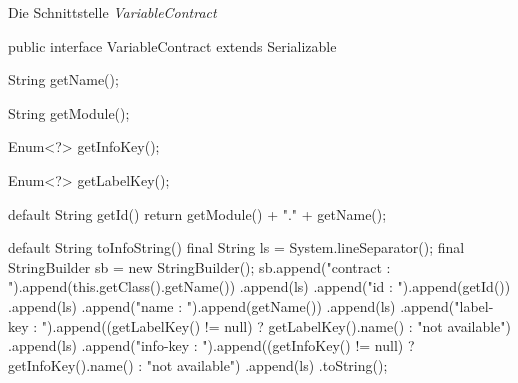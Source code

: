 \begin{program}[h]
\caption{Die Schnittstelle \emph{VariableContract}}
\label{prog:variableContract}
\begin{JavaCode}
public interface VariableContract extends Serializable {

    String getName();

    String getModule();

    Enum<?> getInfoKey();

    Enum<?> getLabelKey();

    default String getId() {      
        return getModule() + "." + getName();
    }

    default String toInfoString() {
        final String ls = System.lineSeparator();
        final StringBuilder sb = new StringBuilder();
        sb.append("contract  : ").append(this.getClass().getName())
          .append(ls)
          .append("id        : ").append(getId())
          .append(ls)
          .append("name      : ").append(getName())
          .append(ls)
          .append("label-key : ").append((getLabelKey() != null) 
                                          ? getLabelKey().name() 
                                          : "not available")
          .append(ls)
          .append("info-key  : ").append((getInfoKey() != null) 
                                          ? getInfoKey().name() 
                                          : "not available")
          .append(ls)
          .toString();
    }
}
\end{JavaCode}
\end{program}

